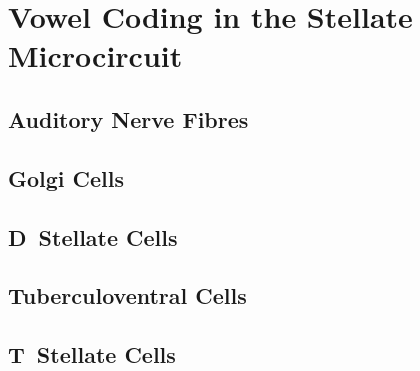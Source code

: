 
\section{Vowel Coding in the Stellate Microcircuit}

\subsection{Auditory Nerve Fibres}

\subsection{Golgi Cells}

\subsection{D~Stellate Cells}

\subsection{Tuberculoventral Cells}

\subsection{T~Stellate Cells}



